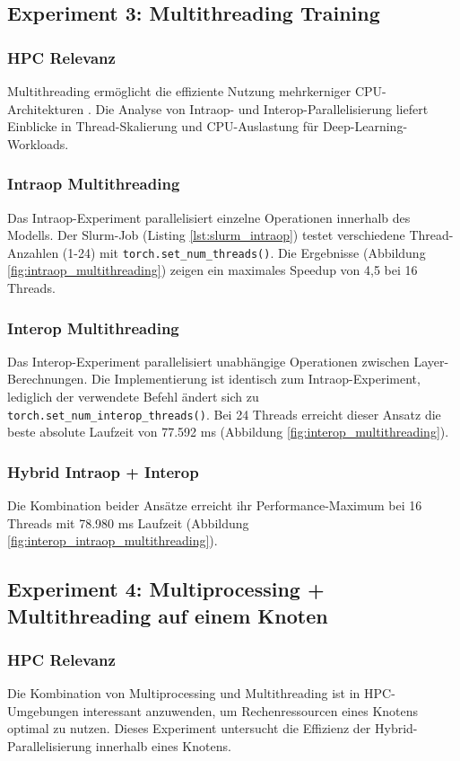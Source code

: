 \documentclass{article}
\begin{document}
\subsection{Experiment 3: Multithreading Training}
\subsubsection{HPC Relevanz}
Multithreading ermöglicht die effiziente Nutzung mehrkerniger CPU-Architekturen . Die Analyse 
von Intraop- und Interop-Parallelisierung liefert Einblicke in 
Thread-Skalierung und CPU-Auslastung für Deep-Learning-Workloads.
\subsubsection{Intraop Multithreading}
Das Intraop-Experiment parallelisiert einzelne Operationen innerhalb des Modells. Der Slurm-Job (Listing \ref{lst:slurm_intraop}) 
testet verschiedene Thread-Anzahlen (1-24) mit \texttt{torch.set\_num\_threads()}. Die Ergebnisse (Abbildung \ref{fig:intraop_multithreading}) 
zeigen ein maximales Speedup von 4,5 bei 16 Threads.

\subsubsection{Interop Multithreading}
Das Interop-Experiment parallelisiert unabhängige Operationen zwischen 
Layer-Berechnungen. Die Implementierung ist identisch zum Intraop-Experiment, 
lediglich der verwendete Befehl ändert sich zu \texttt{torch.set\_num\_interop\_threads()}. 
Bei 24 Threads erreicht dieser Ansatz die beste absolute 
Laufzeit von 77.592 ms (Abbildung \ref{fig:interop_multithreading}).

\subsubsection{Hybrid Intraop + Interop}
Die Kombination beider Ansätze erreicht ihr Performance-Maximum bei 16 Threads mit 78.980 ms Laufzeit (Abbildung 
\ref{fig:interop_intraop_multithreading}).

\subsection{Experiment 4: Multiprocessing + Multithreading auf einem Knoten}
\subsubsection{HPC Relevanz}
Die Kombination von Multiprocessing und Multithreading ist in HPC-Umgebungen interessant anzuwenden, 
um Rechenressourcen eines Knotens optimal zu nutzen. 
Dieses Experiment untersucht die Effizienz der Hybrid-Parallelisierung 
innerhalb eines Knotens.
\end{document}
